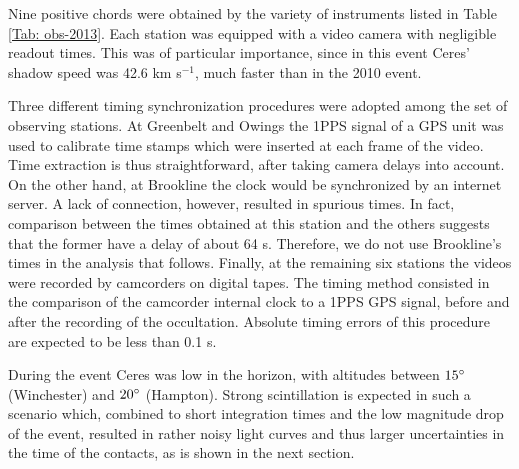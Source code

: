 \documentclass[useAMS,usenatbib]{mn2e}
\begin{document}
Nine positive chords were obtained by the variety of instruments listed in Table \ref{Tab: obs-2013}. Each station was equipped with a video camera with negligible readout times. This was of particular importance, since in this event Ceres' shadow speed was 42.6 km s$^{-1}$, much faster than in the 2010 event.

Three different timing synchronization procedures were adopted among the set of observing stations. At Greenbelt and Owings the 1PPS signal of a GPS unit was used to calibrate time stamps which were inserted at each frame of the video. Time extraction is thus straightforward, after taking camera delays into account. On the other hand, at Brookline the clock would be synchronized by an internet server. A lack of connection, however, resulted in spurious times. In fact, comparison between the times obtained at this station and the others suggests that the former have a delay of about 64 s. Therefore, we do not use Brookline's %
times in the analysis that follows. Finally, at the remaining six stations the videos were recorded by camcorders on digital tapes. The timing method consisted in the comparison of the camcorder internal clock to a 1PPS GPS signal, before and after the recording of the occultation. Absolute timing errors of this procedure are expected to be less than 0.1 s.

During the event Ceres was low in the horizon, with altitudes between $15\hbox{$^\circ$}$ (Winchester) and $20\hbox{$^\circ$}$ (Hampton). Strong scintillation is expected in such a scenario which, combined to short integration times and the low magnitude drop of the event, resulted in rather noisy light curves and thus larger uncertainties in the time of the contacts, as is shown in the next section.
\end{document}
